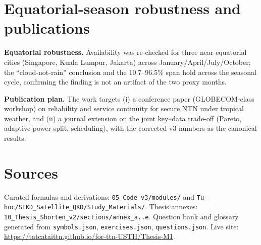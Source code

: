 \section{Equatorial-season robustness and publications}
\textbf{Equatorial robustness.} Availability was re-checked for three near-equatorial cities (Singapore, Kuala Lumpur, Jakarta) across January/April/July/October; the ``cloud-not-rain'' conclusion and the 10.7--96.5\% span hold across the seasonal cycle, confirming the finding is not an artifact of the two proxy months.

\textbf{Publication plan.} The work targets (i) a conference paper (GLOBECOM-class workshop) on reliability and service continuity for secure NTN under tropical weather, and (ii) a journal extension on the joint key--data trade-off (Pareto, adaptive power-split, scheduling), with the corrected v3 numbers as the canonical results.

\section*{Sources}
Curated formulas and derivations: \texttt{05\_Code\_v3/modules/} and \texttt{Tu-hoc/SIKD\_Satellite\_QKD/Study\_Materials/}. Thesis annexes: \texttt{10\_Thesis\_Shorten\_v2/sections/annex\_a..e}. Question bank and glossary generated from \texttt{symbols.json}, \texttt{exercises.json}, \texttt{questions.json}. Live site: \url{https://tatcataittn.github.io/for-ttn-USTH/Thesis-M1}.
